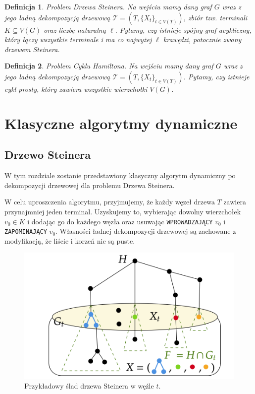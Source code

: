 \documentclass[12pt, oneside]{report}
\newtheorem{definition}{Definicja}
\begin{document}
\begin{definition}
\em \emph{Problem Drzewa Steinera.} Na wejściu mamy dany graf $G$ wraz z jego ładną dekompozycją drzewową $\mathcal{T} = (T, \{X_t\}_{t \in V(T)})$, zbiór tzw. terminali $K \subseteq V(G)$ oraz liczbę naturalną $\ell$. Pytamy, czy istnieje spójny graf acykliczny, który łączy wszystkie terminale i ma co najwyżej $\ell$ krawędzi, potocznie zwany drzewem Steinera.
\end{definition}

\begin{definition}
\em \emph{Problem Cyklu Hamiltona.} Na wejściu mamy dany graf $G$ wraz z jego ładną dekompozycją drzewową $\mathcal{T} = (T, \{X_t\}_{t \in V(T)})$. Pytamy, czy istnieje cykl prosty, który zawiera wszystkie wierzchołki $V(G)$.
\end{definition}

\newpage
  	\chapter{Klasyczne algorytmy dynamiczne}
    	\section{Drzewo Steinera}
    	
W tym rozdziale zostanie przedstawiony klasyczny algorytm dynamiczny po dekompozycji drzewowej dla problemu Drzewa Steinera.

W celu uproszczenia algorytmu, przyjmujemy, że każdy węzeł drzewa $T$ zawiera przynajmniej jeden terminal. Uzyskujemy to, wybierając dowolny wierzchołek $v_0 \in K$ i dodając go do każdego węzła oraz usuwając \texttt{WPROWADZAJĄCY} $v_0$ i \texttt{ZAPOMINAJĄCY} $v_0$. Własności ładnej dekompozycji drzewowej są zachowane z modyfikacją, że liście i korzeń nie są puste.

\begin{figure}
\centering
\includegraphics[width=16cm]{steiner_tree.png}
\caption{Przykładowy ślad drzewa Steinera w węźle $t$.}
\label{steiner_tree}
\end{figure}
\end{document}
